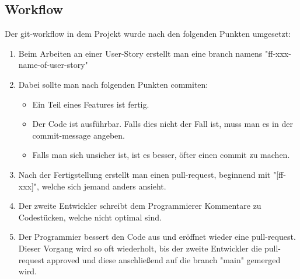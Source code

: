 \subsection{Workflow}\label{subsec:workflow}

\renewcommand{\kapitelautor}{Autor: Felix Zwickelstorfer}
Der git-workflow in dem Projekt wurde nach den folgenden Punkten umgesetzt:
\begin{enumerate}
    \item Beim Arbeiten an einer User-Story erstellt man eine branch namens "ff-xxx-name-of-user-story"
    \item Dabei sollte man nach folgenden Punkten commiten:
    \begin{itemize}
        \item Ein Teil eines Features ist fertig.
        \item Der Code ist ausführbar.
            Falls dies nicht der Fall ist, muss man es in der commit-message angeben.
        \item Falls man sich unsicher ist, ist es besser, öfter einen commit zu machen.
    \end{itemize}
    \item Nach der Fertigstellung erstellt man einen pull-request, beginnend mit "[ff-xxx]", welche sich jemand anders ansieht.
    \item Der zweite Entwickler schreibt dem Programmierer Kommentare zu Codestücken, welche nicht optimal sind.
    \item Der Programmier bessert den Code aus und eröffnet wieder eine pull-request.
        Dieser Vorgang wird so oft wiederholt, bis der zweite Entwickler die pull-request approved und diese anschließend auf die branch "main" gemerged wird.
\end{enumerate}


\renewcommand{\kapitelautor}{}